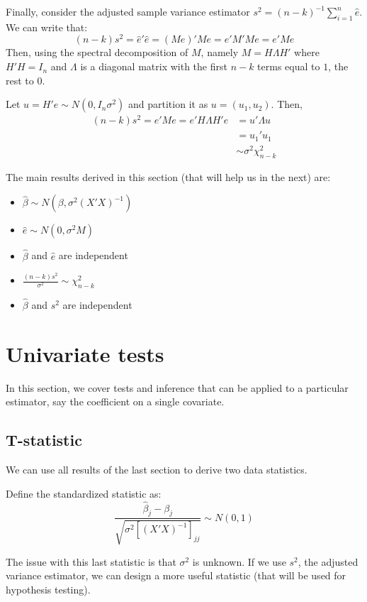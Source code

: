 Finally, consider the adjusted sample variance estimator $s^2 = (n-k)^{-1} \sum_{i=1}^{n} \hat e$. We can write that: $$ (n-k)s^2 = \hat e'\hat e = (Me)'Me = e'M'Me = e'Me $$
Then, using the spectral decomposition of $M$, namely $M = H\Lambda H'$ where $H'H=I_n$ and $\Lambda$ is a diagonal matrix with the first $n-k$ terms equal to $1$, the rest to $0$.

Let $u=H'e\sim N(0,I_n\sigma^2)$ and partition it as $u=(u_1, u_2)$. Then,\begin{align*}
(n-k)s^2 = e'Me = e'H\Lambda H'e & = u'\Lambda u \\
& = u_1'u_1 \\
& \sim \sigma^2 \chi_{n-k}^2
\end{align*}

The main results derived in this section (that will help us in the next) are:\begin{itemize}
\item $\hat{\beta} \sim N(\beta,\sigma^2(X'X)^{-1})$
\item $\hat e \sim N(0, \sigma^2M)$
\item $\hat\beta$ and $\hat e$ are independent
\item $\frac{(n-k)s^2}{\sigma^2}\sim \chi_{n-k}^2$
\item $\hat\beta$ and $s^2$ are independent
\end{itemize}

\newpage

\section{Univariate tests}

In this section, we cover tests and inference that can be applied to a particular estimator, say the coefficient on a single covariate.

\subsection{T-statistic}

We can use all results of the last section to derive two data statistics.

\begin{definition}
Define the standardized statistic as:$$\frac{\hat{\beta}_j - \beta_j}{\sqrt{\sigma^2\left[(X'X)^{-1}\right]_{jj}}} \sim N(0,1) $$
\end{definition}

The issue with this last statistic is that $\sigma^2$ is unknown. If we use $s^2$, the adjusted variance estimator, we can design a more useful statistic (that will be used for hypothesis testing).

